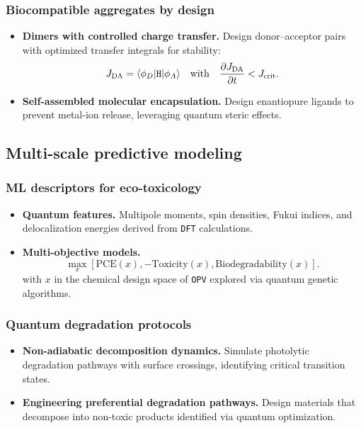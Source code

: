 \documentclass[12pt, a4paper]{article}
\begin{document}
\subsubsection{Biocompatible aggregates by design}

\begin{itemize}
    \item \textbf{Dimers with controlled charge transfer.} Design donor–acceptor pairs with optimized transfer integrals for stability:
    \begin{equation}
    J_{\text{DA}} = \langle \phi_D | \mathtt{H} | \phi_A \rangle \quad \text{with} \quad \pdv{J_{\text{DA}}}{t} < J_{\text{crit}}.
    \end{equation}
    
    \item \textbf{Self-assembled molecular encapsulation.} Design enantiopure ligands to prevent metal-ion release, leveraging quantum steric effects.
\end{itemize}

\subsection{Multi-scale predictive modeling}

\subsubsection{ML descriptors for eco-toxicology}

\begin{itemize}
    \item \textbf{Quantum features.} Multipole moments, spin densities, Fukui indices, and delocalization energies derived from \texttt{DFT} calculations.
    
    \item \textbf{Multi-objective models.}
    \begin{equation}
    \max_{x} [\text{PCE}(x), -\text{Toxicity}(x), \text{Biodegradability}(x)].
    \end{equation}
    with $x$ in the chemical design space of \texttt{OPV} explored via quantum genetic algorithms.
\end{itemize}

\subsubsection{Quantum degradation protocols}

\begin{itemize}
    \item \textbf{Non-adiabatic decomposition dynamics.} Simulate photolytic degradation pathways with surface crossings, identifying critical transition states.
    
    \item \textbf{Engineering preferential degradation pathways.} Design materials that decompose into non-toxic products identified via quantum optimization.
\end{itemize}
\end{document}
